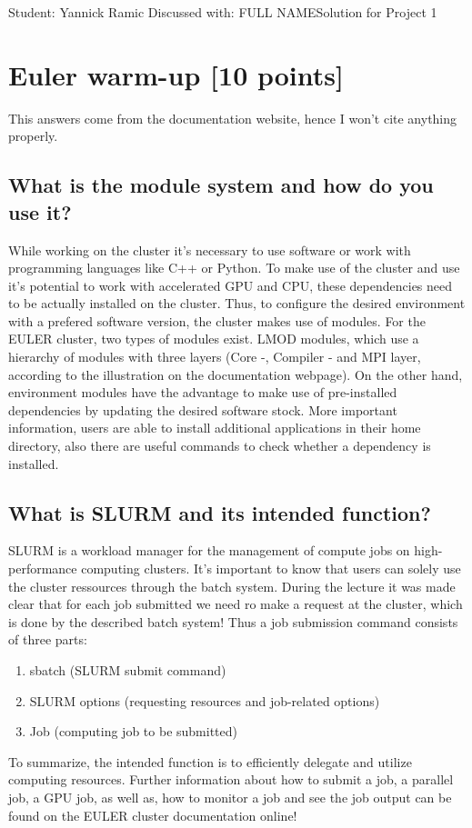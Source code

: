 \documentclass[unicode,11pt,a4paper,oneside,numbers=endperiod,openany]{scrartcl}
\begin{document}
\setassignment
{}

            {Student: Yannick Ramic}
            {Discussed with: FULL NAME}{Solution for Project 1}{}
\newline

\assignmentpolicy

\section{Euler warm-up [10 points]}
This answers come from the documentation website, hence I won't cite anything properly.
\subsection{What is the module system and how do you use it?}
While working on the cluster it's necessary to use software or work with programming
languages like C++ or Python. To make use of the cluster and use it's potential to work
with accelerated GPU and CPU, these dependencies need to be actually installed on the 
cluster. Thus, to configure the desired environment with a prefered software version, the
cluster makes use of modules. For the EULER cluster, two types of modules exist. LMOD
modules, which use a hierarchy of modules with three layers (Core -, Compiler - and MPI layer,
according to the illustration on the documentation webpage). On the other hand, environment
modules have the advantage to make use of pre-installed dependencies by updating the
desired software stock. More important information, users are able to install additional
applications in their home directory, also there are useful commands to check whether a 
dependency is installed.
\subsection{What is SLURM and its intended function?}
SLURM is a workload manager for the management of compute jobs on high-performance computing 
clusters. It's important to know that 
users can solely use the cluster ressources through the batch system. During the lecture it
was made clear that for each job submitted we need ro make a request at the cluster,
which is done by the described batch system! Thus a job submission command consists of three
parts:
\begin{enumerate}
    \item sbatch (SLURM submit command)
    \item SLURM options (requesting resources and job-related options)
    \item Job (computing job to be submitted)
\end{enumerate}
To summarize, the intended function is to efficiently delegate and utilize computing resources.
Further information about how to submit a job, a parallel job, a GPU job, as well as, how to 
monitor a job and see the job output can be found on the EULER cluster documentation online!
\end{document}
